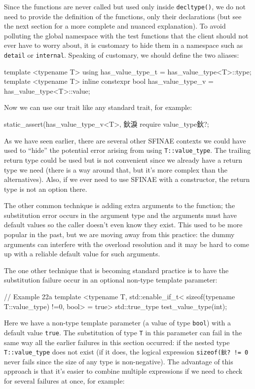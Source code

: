 Since the functions are never called but used only inside \texttt{decltype()}, we do not need to provide the definition of the functions, only their declarations (but see the next section for a more complete and nuanced explanation). To avoid polluting the global namespace with the test functions that the client should not ever have to worry about, it is customary to hide them in a namespace such as \texttt{detail} or \texttt{internal}. Speaking of customary, we should define the two aliases:

\begin{code}
template <typename T>
using has_value_type_t = has_value_type<T>::type;
template <typename T> inline constexpr
bool has_value_type_v = has_value_type<T>::value;
\end{code}

Now we can use our trait like any standard trait, for example:

\begin{code}
static_assert(has_value_type_v<T>, 鈥淚 require value_type鈥?;
\end{code}

As we have seen earlier, there are several other SFINAE contexts we could have used to ``hide'' the potential error arising from using \texttt{T::value\_type}. The trailing return type could be used but is not convenient since we already have a return type we need (there is a way around that, but it's more complex than the alternatives). Also, if we ever need to use SFINAE with a constructor, the return type is not an option there.

The other common technique is adding extra arguments to the function; the substitution error occurs in the argument type and the arguments must have default values so the caller doesn't even know they exist. This used to be more popular in the past, but we are moving away from this practice: the dummy arguments can interfere with the overload resolution and it may be hard to come up with a reliable default value for such arguments.

The one other technique that is becoming standard practice is to have the substitution failure occur in an optional non-type template parameter:

\begin{code}
// Example 22a
template <typename T, std::enable_if_t<
  sizeof(typename T::value_type) !=0, bool> = true>
std::true_type test_value_type(int);
\end{code}

Here we have a non-type template parameter (a value of type \texttt{bool}) with a default value \texttt{true}. The substitution of type \texttt{T} in this parameter can fail in the same way all the earlier failures in this section occurred: if the nested type \texttt{T::value\_type} does not exist (if it does, the logical expression \texttt{sizeof(鈥?\ !=\ 0} never fails since the size of any type is non-negative). The advantage of this approach is that it's easier to combine multiple expressions if we need to check for several failures at once, for example:

